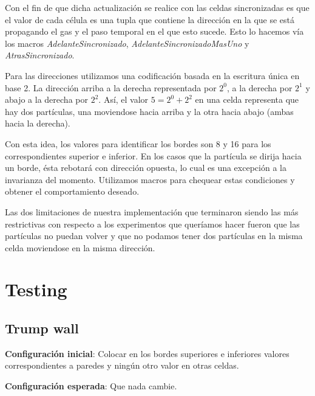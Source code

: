 \documentclass[10pt,a4paper]{article}
\begin{document}
Con el fin de que dicha actualizaci\'on se realice con las celdas sincronizadas es que el valor de cada c\'elula es una tupla que contiene la direcci\'on en la que se est\'a propagando el gas y el paso temporal en el que esto sucede. Esto lo hacemos v\'ia los macros \textit{AdelanteSincronizado}, \textit{AdelanteSincronizadoMasUno} y \textit{AtrasSincronizado}.

Para las direcciones utilizamos una codificaci\'on basada en la escritura \'unica en base 2. La direcci\'on arriba a la derecha representada por $2^0$, a la derecha por $2^1$ y abajo a la derecha por $2^2$. As\'i, el valor $5=2^0+2^2$ en una celda representa que hay dos part\'iculas, una moviendose hacia arriba y la otra hacia abajo (ambas hacia la derecha).

Con esta idea, los valores para identificar los bordes son 8 y 16 para los correspondientes superior e inferior. En los casos que la part\'icula se dirija hacia un borde, \'esta rebotar\'a con direcci\'on opuesta, lo cual es una excepci\'on a la
invarianza del momento. Utilizamos macros para chequear estas condiciones y obtener el comportamiento deseado.

Las dos limitaciones de nuestra implementaci\'on que terminaron siendo las m\'as restrictivas con respecto a los experimentos que quer\'iamos hacer fueron que las part\'iculas no puedan volver y que no podamos tener dos part\'iculas en la misma celda moviendose en la misma direcci\'on.


\section*{Testing}


\subsection*{Trump wall}
\textbf{Configuración inicial}: Colocar en los bordes superiores e inferiores valores correspondientes a paredes y ningún otro valor en otras celdas.


\textbf{Configuración esperada}: Que nada cambie.
\end{document}
